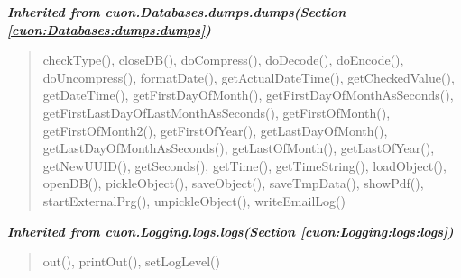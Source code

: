 \large{\textbf{\textit{Inherited from cuon.Databases.dumps.dumps\textit{(Section \ref{cuon:Databases:dumps:dumps})}}}}

\begin{quote}
checkType(), closeDB(), doCompress(), doDecode(), doEncode(), doUncompress(), formatDate(), getActualDateTime(), getCheckedValue(), getDateTime(), getFirstDayOfMonth(), getFirstDayOfMonthAsSeconds(), getFirstLastDayOfLastMonthAsSeconds(), getFirstOfMonth(), getFirstOfMonth2(), getFirstOfYear(), getLastDayOfMonth(), getLastDayOfMonthAsSeconds(), getLastOfMonth(), getLastOfYear(), getNewUUID(), getSeconds(), getTime(), getTimeString(), loadObject(), openDB(), pickleObject(), saveObject(), saveTmpData(), showPdf(), startExternalPrg(), unpickleObject(), writeEmailLog()
\end{quote}

\large{\textbf{\textit{Inherited from cuon.Logging.logs.logs\textit{(Section \ref{cuon:Logging:logs:logs})}}}}

\begin{quote}
out(), printOut(), setLogLevel()
\end{quote}
